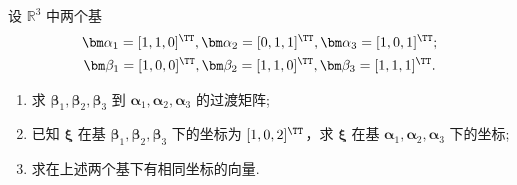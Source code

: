 	\begin{titwo}
		设 $\mathbb{R}^{3}$ 中两个基
		\begin{gather*}
			\bm \alpha_{1} = [1,1,0]^{\TT}, \bm \alpha_{2} = [0,1,1]^{\TT}, \bm \alpha_{3} = [1,0,1]^{\TT}; \\
			\bm \beta_{1} = [1,0,0]^{\TT}, \bm \beta_{2} = [1,1,0]^{\TT}, \bm \beta_{3} = [1,1,1]^{\TT}.
		\end{gather*}
		\begin{enumerate}
			\item 求 $\bm \beta_{1},\bm \beta_{2},\bm \beta_{3}$ 到 $\bm \alpha_{1},\bm \alpha_{2},\bm \alpha_{3}$ 的过渡矩阵;
			\item 已知 $\bm \xi$ 在基 $\bm \beta_{1},\bm \beta_{2},\bm \beta_{3}$ 下的坐标为 $[1,0,2]^{\TT}$，求 $\bm \xi$ 在基 $\bm \alpha_{1},\bm \alpha_{2},\bm \alpha_{3}$ 下的坐标;
			\item 求在上述两个基下有相同坐标的向量.
		\end{enumerate}
	\end{titwo}